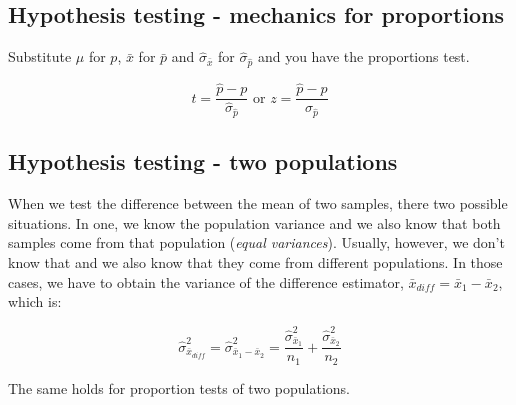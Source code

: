 \documentclass[11pt]{article}
\begin{document}
	\subsection*{Hypothesis testing - mechanics for proportions}

	Substitute $\mu$ for $p$, $\bar{x}$ for $\bar{p}$ and $\hat{\sigma}_{\bar{x}}$ for $\hat{\sigma}_{\hat{p}}$ and you have the proportions test.

		\[t = \frac{\hat{p} - p}{\hat{\sigma}_{\hat{p}}} \text{ or } z = \frac{\hat{p} - p}{\sigma_{\hat{p}}}\]


	\subsection*{Hypothesis testing - two populations}
	When we test the difference between the mean of two samples, there two possible situations. In one, we know the population variance and we also know that both samples come from that population (\emph{equal variances}). Usually, however, we don't know that and we also know that they come from different populations. In those cases, we have to obtain the variance of the difference estimator, $\bar{x}_{diff} = \bar{x}_1 - \bar{x}_2$, which is:
	
	\[\hat{\sigma}^2_{\bar{x}_{diff}} = \hat{\sigma}^2_{\bar{x}_1 - \bar{x}_2} = \frac{\hat{\sigma}^2_{\bar{x}_1}}{n_1}+ \frac{\hat{\sigma}^2_{\bar{x}_2}}{n_2}\] 

	The same holds for proportion tests of two populations.
\end{document}
